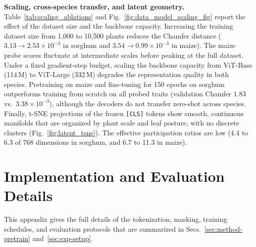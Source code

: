 \documentclass[10pt,twocolumn,letterpaper]{article}
\begin{document}
\noindent\textbf{Scaling, cross-species transfer, and latent geometry.}
Table~\ref{tab:scaling_ablations} and Fig.~\ref{fig:data_model_scaling_fig} report the effect of the dataset size and the backbone capacity. Increasing the training dataset size from 1{,}000 to 10{,}500 plants reduces the Chamfer distance ($3.13 \to 2.53 \times 10^{-3}$ in sorghum and $3.54 \to 0.99 \times 10^{-3}$ in maize). The maize probe scores fluctuate at intermediate scales before peaking at the full dataset. Under a fixed gradient-step budget, scaling the backbone capacity from ViT-Base (114\,M) to ViT-Large (332\,M) degrades the representation quality in both species. Pretraining on maize and fine-tuning for 150 epochs on sorghum outperforms training from scratch on all probed traits (validation Chamfer $1.83$ vs.\ $3.38 \times 10^{-3}$), although the decoders do not transfer zero-shot across species. Finally, t-SNE projections of the frozen \texttt{[CLS]} tokens show smooth, continuous manifolds that are organized by plant scale and leaf posture, with no discrete clusters (Fig.~\ref{fig:latent_tsne}). The effective participation ratios are low (4.4 to 6.3 of 768 dimensions in sorghum, and 6.7 to 11.3 in maize).

\section{Implementation and Evaluation Details}
\label{app:impl}

This appendix gives the full details of the tokenization, masking, training schedules, and evaluation protocols that are summarized in Secs.~\ref{sec:method-pretrain} and~\ref{sec:exp-setup}.
\end{document}
